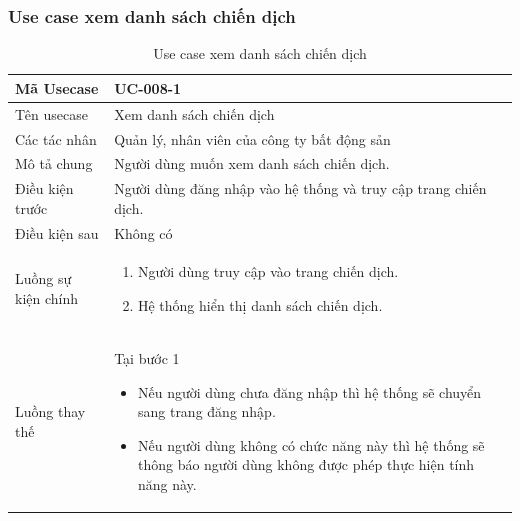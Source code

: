 \documentclass[12pt,a4paper]{article}
\begin{document}
    \subsubsection*{Use case xem danh sách chiến dịch}
    \begin{table}[H]
        \centering
        \begin{tabular}{|p{3.5cm}|p{11.5cm}|c|}
            \hline
            Mã Usecase      & UC-008-1                                                        \\
            \hline
            Tên usecase     & Xem danh sách chiến dịch                                        \\
            \hline
            Các tác nhân    & Quản lý, nhân viên của công ty bất động sản                     \\
            \hline
            Mô tả chung     & Người dùng muốn xem danh sách chiến dịch.                       \\
            \hline

            Điều kiện trước & Người dùng đăng nhập vào hệ thống và truy cập trang chiến dịch. \\
            \hline

            Điều kiện sau   & Không có                                                        \\
            \hline

            Luồng sự kiện chính & \vspace{-.8cm}\begin{enumerate}
                                                    \item Người dùng truy cập vào trang chiến dịch.
                                                    \item Hệ thống hiển thị danh sách chiến dịch.
            \end{enumerate}
            \\
            \hline
            Luồng thay thế & Tại bước 1\newline
            \vspace{-.8cm}\begin{itemize}
                              \item Nếu người dùng chưa đăng nhập thì hệ thống sẽ chuyển sang trang đăng nhập.
                              \item  Nếu người dùng không có chức năng này thì hệ thống sẽ thông báo người dùng không được phép thực hiện tính năng này.
            \end{itemize}

            \\    \hline
        \end{tabular}
        \caption{Use case xem danh sách chiến dịch}
    \end{table}
\end{document}
